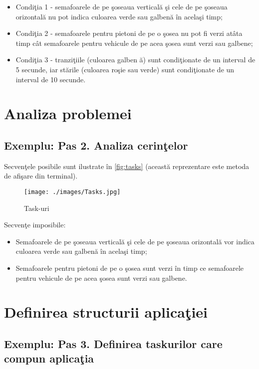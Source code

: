 \documentclass[a4paper, 11pt]{article}
\begin{document}
\begin{itemize}
\item Condi\c{t}ia 1 - semafoarele de pe \c{s}oseaua vertical\u{a} \c{s}i cele de pe \c{s}oseaua orizontal\u{a} nu pot indica culoarea verde sau galben\u{a}  \^{i}n acela\c{s}i timp;
\item Condi\c{t}ia 2 - semafoarele pentru pietoni de pe o \c{s}osea nu pot fi verzi at\^{a}ta timp c\^{a}t semafoarele pentru vehicule de pe acea \c{s}osea sunt verzi sau galbene;
\item Condi\c{t}ia 3 - tranzi\c{t}iile (culoarea galben \u{a}) sunt condi\c{t}ionate de un interval de 5 secunde, iar st\u{a}rile (culoarea ro\c{s}ie sau verde) sunt condi\c{t}ionate de un interval de 10 secunde.
\end{itemize}


\section{Analiza problemei}

\subsection{Exemplu: Pas 2. Analiza cerin\c{t}elor} 
Secven\c{t}ele posibile sunt ilustrate \^{i}n \autoref{fig:tasks} (aceast\u{a} reprezentare este metoda de afi\c{s}are din terminal). 
\begin{figure}
\centering
\texttt{[image: ./images/Tasks.jpg]}
\caption{Task-uri}
\label{fig:tasks}
\end{figure}
\newline\newline
Secven\c{t}e imposibile:

\begin{itemize}
\item Semafoarele de pe \c{s}oseaua vertical\u{a} \c{s}i cele de pe \c{s}oseaua orizontal\u{a} vor indica culoarea verde sau galben\u{a} \^{i}n acela\c{s}i timp;
\item Semafoarele pentru pietoni de pe o \c{s}osea sunt verzi \^{i}n timp ce semafoarele pentru vehicule de pe acea \c{s}osea sunt verzi sau galbene.
\end{itemize}

\section{Definirea structurii aplica\c{t}iei}

\subsection{Exemplu: Pas 3. Definirea taskurilor care compun aplica\c{t}ia}
\end{document}
